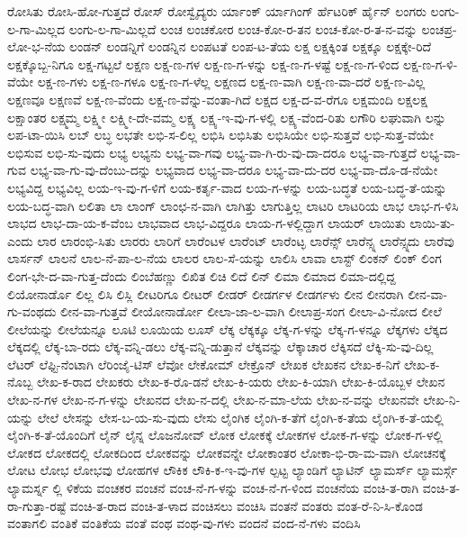 {ರೋಸಿತು
ರೋಸಿ-ಹೋ-ಗುತ್ತದೆ
ರೋಸ್
ರೋಸ್ವೈದ್ಯರು
ರ್ಯಾಂಕ್
ರ್ಯಾಗಿಂಗ್
ರ್ಹೆಟರಿಕ್
ರ್ಹೈನ್
ಲಂಗರು
ಲಂಗು-ಲ-ಗಾ-ಮಿಲ್ಲದ
ಲಂಗು-ಲ-ಗಾ-ಮಿಲ್ಲದೆ
ಲಂಚ
ಲಂಚಕೋರ
ಲಂಚ-ಕೋ-ರ-ತನ
ಲಂಚ-ಕೋ-ರ-ತ-ನ-ವನ್ನು
ಲಂಚಪ್ರ-ಲೋ-ಭ-ನೆಯ
ಲಂಡನ್
ಲಂಡನ್ನಿಗೆ
ಲಂಡನ್ನಿನ
ಲಂಪಟತೆ
ಲಂಪ-ಟ-ತೆಯ
ಲಕ್ಷ
ಲಕ್ಷಕ್ಕಿಂತ
ಲಕ್ಷಕ್ಕೂ
ಲಕ್ಷಕ್ಕೇ-ರಿದೆ
ಲಕ್ಷಕ್ಕೊಬ್ಬ-ನಿಗೂ
ಲಕ್ಷ-ಗಟ್ಟಲೆ
ಲಕ್ಷಣ
ಲಕ್ಷ-ಣ-ಗಳ
ಲಕ್ಷ-ಣ-ಗ-ಳನ್ನು
ಲಕ್ಷ-ಣ-ಗ-ಳಷ್ಟೆ
ಲಕ್ಷ-ಣ-ಗ-ಳಿಂದ
ಲಕ್ಷ-ಣ-ಗ-ಳಿ-ವೆಯೇ
ಲಕ್ಷ-ಣ-ಗಳು
ಲಕ್ಷ-ಣ-ಗಳೂ
ಲಕ್ಷ-ಣ-ಗ-ಳೆಲ್ಲ
ಲಕ್ಷಣದ
ಲಕ್ಷ-ಣ-ವಾಗಿ
ಲಕ್ಷ-ಣ-ವಾ-ದರೆ
ಲಕ್ಷ-ಣ-ವಿಲ್ಲ
ಲಕ್ಷಣವೂ
ಲಕ್ಷಣವೆ
ಲಕ್ಷ-ಣ-ವೆಂದು
ಲಕ್ಷ-ಣ-ವೆನ್ನು-ವಂತಾ-ಗಿದೆ
ಲಕ್ಷದ
ಲಕ್ಷ-ದ-ವ-ರೆಗೂ
ಲಕ್ಷಮಂದಿ
ಲಕ್ಷಲಕ್ಷ
ಲಕ್ಷಾಂತರ
ಲಕ್ಷ್ಮಮ್ಮ
ಲಕ್ಷ್ಮೀ
ಲಕ್ಷ್ಮೀ-ದೇ-ವಮ್ಮ
ಲಕ್ಷ್ಯ
ಲಕ್ಷ್ಯ-ಇ-ವು-ಗ-ಳಲ್ಲಿ
ಲಕ್ಷ್ಯ-ವೆಂದ-ರಿತು
ಲಗೌರಿ
ಲಘುವಾಗಿ
ಲನ್ನು
ಲಪ-ಟಾ-ಯಿಸಿ
ಲಬ್
ಲಬ್ಧ
ಲಭತೇ
ಲಭಿ-ಸ-ಲಿಲ್ಲ
ಲಭಿಸಿ
ಲಭಿಸಿತು
ಲಭಿಸಿಯೇ
ಲಭಿ-ಸುತ್ತವೆ
ಲಭಿ-ಸುತ್ತ-ವೆಯೇ
ಲಭಿಸುವ
ಲಭಿ-ಸು-ವುದು
ಲಭ್ಯ
ಲಭ್ಯನು
ಲಭ್ಯ-ವಾ-ಗವು
ಲಭ್ಯ-ವಾ-ಗಿ-ರು-ವು-ದಾ-ದರೂ
ಲಭ್ಯ-ವಾ-ಗುತ್ತದೆ
ಲಭ್ಯ-ವಾ-ಗುವ
ಲಭ್ಯ-ವಾ-ಗು-ವು-ದೆಂಬು-ದನ್ನು
ಲಭ್ಯವಾದ
ಲಭ್ಯ-ವಾ-ದರೂ
ಲಭ್ಯ-ವಾ-ದು-ದರ
ಲಭ್ಯ-ವಾ-ದೊ-ಡ-ನೆಯೇ
ಲಭ್ಯವಿದ್ದ
ಲಭ್ಯವಿಲ್ಲ
ಲಯ-ಇ-ವು-ಗ-ಳಿಗೆ
ಲಯ-ಕರ್ತೃ-ವಾದ
ಲಯ-ಗ-ಳನ್ನು
ಲಯ-ಬದ್ಧತೆ
ಲಯ-ಬದ್ಧ-ತೆ-ಯನ್ನು
ಲಯ-ಬದ್ಧ-ವಾಗಿ
ಲಲಿತಾ
ಲಾ
ಲಾಂಗ್
ಲಾಂಛ-ನ-ವಾಗಿ
ಲಾಗಿತ್ತು
ಲಾಗುತ್ತಿಲ್ಲ
ಲಾಟರಿ
ಲಾಟರಿಯ
ಲಾಭ
ಲಾಭ-ಗ-ಳಿಸಿ
ಲಾಭದ
ಲಾಭ-ದಾ-ಯ-ಕ-ವೆಂಬ
ಲಾಭವಾದ
ಲಾಭ-ವಿದ್ದರೂ
ಲಾಯ-ಗ-ಳಲ್ಲಿದ್ದಾಗ
ಲಾಯರ್
ಲಾಯಿತು
ಲಾಯಿ-ತು-ಎಂದು
ಲಾರ
ಲಾರಂಭಿ-ಸಿತು
ಲಾರರು
ಲಾರಿಗೆ
ಲಾರೆಂಟಳ
ಲಾರೆಂಟ್
ಲಾರೆಂಟ್ಳ
ಲಾರೆನ್ಸ್
ಲಾರೆನ್ಸ್ನ
ಲಾರೆನ್ಸ್ನದು
ಲಾರೆವು
ಲಾರ್ಸನ್
ಲಾಲನೆ
ಲಾಲ-ನೆ-ಪಾ-ಲ-ನೆಯ
ಲಾಲರ
ಲಾಲ-ಸೆ-ಯನ್ನು
ಲಾಲಿಸಿ
ಲಾವಾ
ಲಾಸ್ಟ್
ಲಿಂಕನ್
ಲಿಂಕ್
ಲಿಂಗ
ಲಿಂಗ-ಭೇ-ದ-ವಾ-ಗುತ್ತ-ದೆಂದು
ಲಿಂಬೆಹಣ್ಣು
ಲಿಖಿತ
ಲಿಚಿ
ಲಿದೆ
ಲಿನ್
ಲಿಮಾ
ಲಿಮಾದ
ಲಿಮಾ-ದಲ್ಲಿದ್ದ
ಲಿಯೋನಾರ್ಡೊ
ಲಿಲ್ಲ
ಲಿಸಿ
ಲಿಸ್ಲಿ
ಲೀಟರಿಗೂ
ಲೀಟರ್
ಲೀಡರ್
ಲೀಡರ್ಗಳ
ಲೀಡರ್ಗಳು
ಲೀನ
ಲೀನರಾಗಿ
ಲೀನ-ವಾ-ಗು-ವಂಥದು
ಲೀನ-ವಾ-ಗುತ್ತವೆ
ಲೀಯೋನಾರ್ಡೋ
ಲೀಲಾ-ಜಾ-ಲ-ವಾಗಿ
ಲೀಲಾಪ್ರ-ಸಂಗ
ಲೀಲಾ-ವಿ-ನೋದ
ಲೀಲೆ
ಲೀಲೆಯನ್ನು
ಲೀಲೆಯನ್ನೂ
ಲೂಟಿ
ಲೂಯಿಯ
ಲೂಸ್
ಲೆಕ್ಕ
ಲೆಕ್ಕಕ್ಕೂ
ಲೆಕ್ಕ-ಗ-ಳನ್ನು
ಲೆಕ್ಕ-ಗ-ಳನ್ನೂ
ಲೆಕ್ಕಗಳು
ಲೆಕ್ಕದ
ಲೆಕ್ಕದಲ್ಲಿ
ಲೆಕ್ಕ-ಬಾ-ರದು
ಲೆಕ್ಕ-ವನ್ನಿ-ಡಲು
ಲೆಕ್ಕ-ವನ್ನಿ-ಡುತ್ತಾನೆ
ಲೆಕ್ಕವನ್ನು
ಲೆಕ್ಕಾಚಾರ
ಲೆಕ್ಕಿಸದೆ
ಲೆಕ್ಕಿ-ಸು-ವು-ದಿಲ್ಲ
ಲೆಟರ್
ಲೆಫ್ಟಿ-ನೆಂಟಾಗಿ
ಲೆರಿಂಜೈ-ಟಿಸ್
ಲೆವೋ
ಲೇಕೋಮ್
ಲೇಕ್ರೊನ್
ಲೇಖಕ
ಲೇಖಕನ
ಲೇಖ-ಕ-ನಿಗೆ
ಲೇಖ-ಕ-ನೊಬ್ಬ
ಲೇಖ-ಕ-ರಾದ
ಲೇಖಕರು
ಲೇಖ-ಕ-ರೊ-ಡನೆ
ಲೇಖ-ಕಿ-ಯರು
ಲೇಖ-ಕಿ-ಯಾಗಿ
ಲೇಖ-ಕಿ-ಯೊಬ್ಬಳ
ಲೇಖನ
ಲೇಖ-ನ-ಗಳ
ಲೇಖ-ನ-ಗ-ಳನ್ನು
ಲೇಖನದ
ಲೇಖ-ನ-ದಲ್ಲಿ
ಲೇಖ-ನ-ಮಾ-ಲೆಯ
ಲೇಖ-ನ-ವನ್ನು
ಲೇಖನವೇ
ಲೇಖ-ನಿ-ಯನ್ನು
ಲೇಲೆ
ಲೇಸನ್ನು
ಲೇಸ-ಬ-ಯ-ಸು-ವುದು
ಲೇಸು
ಲೈಂಗಿಕ
ಲೈಂಗಿ-ಕ-ತೆಗೆ
ಲೈಂಗಿ-ಕ-ತೆಯ
ಲೈಂಗಿ-ಕ-ತೆ-ಯಲ್ಲಿ
ಲೈಂಗಿ-ಕ-ತೆ-ಯೊಂದಿಗೆ
ಲೈನ್
ಲೈನ್ನ
ಲೊಜನೋವ್
ಲೋಕ
ಲೋಕಕ್ಕೆ
ಲೋಕಗಳ
ಲೋಕ-ಗ-ಳನ್ನು
ಲೋಕ-ಗ-ಳಲ್ಲಿ
ಲೋಕದ
ಲೋಕದಲ್ಲಿ
ಲೋಕದಿಂದ
ಲೋಕವನ್ನು
ಲೋಕವನ್ನೇ
ಲೋಕಾಂತರ
ಲೋಕಾ-ಭಿ-ರಾ-ಮ-ವಾಗಿ
ಲೋಚನಕ್ಕೆ
ಲೋಟ
ಲೋಭ
ಲೋಭವು
ಲೋಹಗಳ
ಲೌಕಿಕ
ಲೌಕಿ-ಕ-ಇ-ವು-ಗಳ
ಲ್ಪಟ್ಟ
ಲ್ಯಾಂಡಿಗೆ
ಲ್ಯಾಟಿನ್
ಲ್ಯಾಮರ್ಸ್
ಲ್ಯಾಮರ್ಸ್ಗೆ
ಲ್ಯಾಮರ್ಸ್ನ
ಲ್ಲಿ
ಳಿಕೆಯ
ವಂಚಕರ
ವಂಚನೆ
ವಂಚ-ನೆ-ಗ-ಳನ್ನು
ವಂಚ-ನೆ-ಗ-ಳಿಂದ
ವಂಚನೆಯ
ವಂಚಿ-ತ-ರಾಗಿ
ವಂಚಿ-ತ-ರಾ-ಗುತ್ತಾ-ರಷ್ಟೆ
ವಂಚಿ-ತ-ರಾದ
ವಂಚಿ-ತ-ಳಾದ
ವಂಚಿಸಲು
ವಂಚಿಸಿ
ವಂತನೆ
ವಂತರು
ವಂತ-ರೆ-ನಿ-ಸಿ-ಕೊಂಡ
ವಂತಾಗಲಿ
ವಂತಿಕೆ
ವಂತಿಕೆಯ
ವಂತೆ
ವಂಥ
ವಂಥ-ವು-ಗಳು
ವಂದನೆ
ವಂದ-ನೆ-ಗಳು
ವಂದಿಸಿ
}
